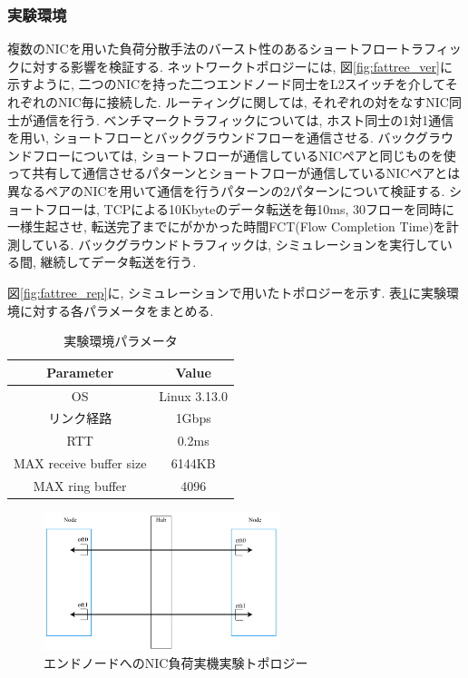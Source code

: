 \documentclass[11pt, a4paper, twocolumn]{jsarticle}
\begin{document}
\subsubsection{実験環境}
複数のNICを用いた負荷分散手法のバースト性のあるショートフロートラフィックに対する影響を検証する.
ネットワークトポロジーには,
図\ref{fig:fattree_ver}に示すように, 二つのNICを持った二つエンドノード同士をL2スイッチを介してそれぞれのNIC毎に接続した.
ルーティングに関しては, それぞれの対をなすNIC同士が通信を行う.
ベンチマークトラフィックについては, ホスト同士の1対1通信を用い, ショートフローとバックグラウンドフローを通信させる.
バックグラウンドフローについては,
ショートフローが通信しているNICペアと同じものを使って共有して通信させるパターンとショートフローが通信しているNICペアとは異なるペアのNICを用いて通信を行うパターンの2パターンについて検証する.
ショートフローは, TCPによる10Kbyteのデータ転送を毎10ms, 30フローを同時に一様生起させ, 転送完了までにがかかった時間FCT(Flow
Completion Time)を計測している.
バックグラウンドトラフィックは, シミュレーションを実行している間, 継続してデータ転送を行う.

図\ref{fig:fattree_rep}に, シミュレーションで用いたトポロジーを示す.
表\ref{table:experiment_ver}に実験環境に対する各パラメータをまとめる.
\begin{table}[h]
\begin{center}
\footnotesize
\begin{tabular}{c|c}
\hline
Parameter & Value \\ \hline \hline
OS & Linux 3.13.0 \\
リンク経路 & 1Gbps \\
RTT & 0.2ms\\
MAX receive buffer size & 6144KB \\
MAX ring buffer & 4096 \\
\hline
\end{tabular}
\caption{実験環境パラメータ}
\label{table:experiment_ver}
\end{center}
\end{table}

\begin{figure}[h]
    \begin{center}
    \includegraphics[autoebb, width=195pt]{./img/topology_real.pdf}
    \caption{エンドノードへのNIC負荷実機実験トポロジー}
    \label{fig:topology_real}
    \end{center}
\end{figure}
\end{document}
